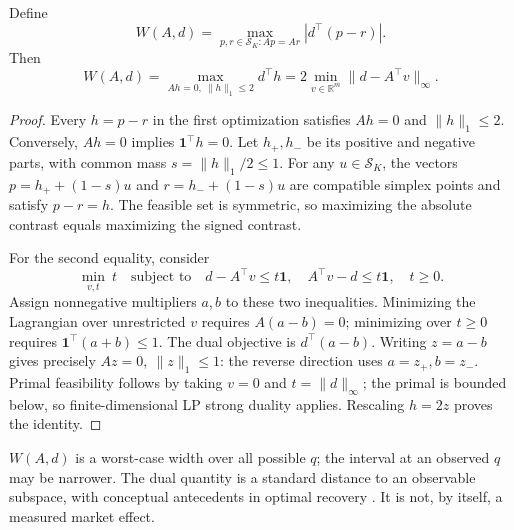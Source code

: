 \begin{theorem}
\label{thm:hidden-width}
Define
\[
 W(A,d)=\max_{p,r\in\mathcal S_K:Ap=Ar}|d^\top(p-r)|.
\]
Then
\begin{equation}
\label{eq:hidden-width-dual}
 W(A,d)
 =\max_{Ah=0,\ \|h\|_1\leq2}d^\top h
 =2\min_{v\in\mathbb R^m}\|d-A^\top v\|_\infty.
\end{equation}
\end{theorem}
\begin{proof}
Every $h=p-r$ in the first optimization satisfies $Ah=0$ and $\|h\|_1\leq2$.
Conversely, $Ah=0$ implies $\mathbf1^\top h=0$. Let $h_+,h_-$ be its positive
and negative parts, with common mass $s=\|h\|_1/2\leq1$. For any
$u\in\mathcal S_K$, the vectors $p=h_++(1-s)u$ and $r=h_-+(1-s)u$ are
compatible simplex points and satisfy $p-r=h$. The feasible set is symmetric,
so maximizing the absolute contrast equals maximizing the signed contrast.

For the second equality, consider
\[
 \min_{v,t}\ t\quad\text{subject to}\quad
 d-A^\top v\leq t\mathbf1,\quad
 A^\top v-d\leq t\mathbf1,\quad t\geq0.
\]
Assign nonnegative multipliers $a,b$ to these two inequalities. Minimizing the
Lagrangian over unrestricted $v$ requires $A(a-b)=0$; minimizing over $t\geq0$
requires $\mathbf1^\top(a+b)\leq1$. The dual objective is $d^\top(a-b)$.
Writing $z=a-b$ gives precisely $Az=0,\ \|z\|_1\leq1$: the reverse direction
uses $a=z_+,b=z_-$. Primal feasibility follows by taking $v=0$ and
$t=\|d\|_\infty$; the primal is bounded below, so finite-dimensional LP strong
duality applies. Rescaling $h=2z$ proves the identity.
\end{proof}

$W(A,d)$ is a worst-case width over all possible $q$; the interval at an observed
$q$ may be narrower. The dual quantity is a standard distance to an observable
subspace, with conceptual antecedents in optimal recovery
\citep{donoho1994}. It is not, by itself, a measured market effect.

